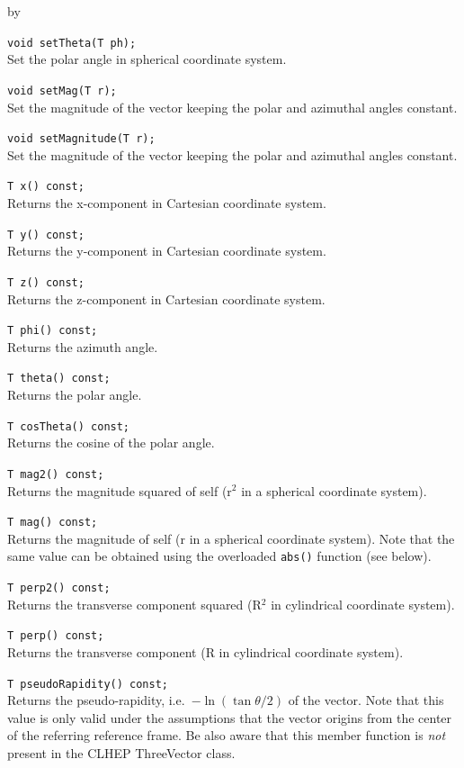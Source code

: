 \documentclass[twoside]{article}
\newcommand{\comp}[1]{\texttt{#1}}%
\newcommand{\entrylabel}[1]{\mbox{\textbf{{#1}}}\hfil}%
\newenvironment{entry}
{\begin{list}{}%
    {\renewcommand{\makelabel}{\entrylabel}%
     \setlength{\labelwidth}{90pt}%
     \setlength{\leftmargin}{\labelwidth}
     \advance\leftmargin by \labelsep%
      }%
    }%
  {\end{list}}
\newcommand{\Entrylabel}[1]%
{\raisebox{0pt}[1ex][0pt]{\makebox[\labelwidth][l]%
    {\parbox[t]{\labelwidth}{\hspace{0pt}\textbf{{#1}}}}}}
\newenvironment{Entry}%
{\renewcommand{\entrylabel}{\Entrylabel}\begin{entry}}%
  {\end{entry}}
\begin{document}
\begin{description}
\begin{Entry}
    \verb+void setTheta(T ph);+\\
    Set the polar angle in spherical coordinate system.

    \verb+void setMag(T r);+\\
    Set the magnitude of the vector keeping the polar and azimuthal
    angles constant.

    \verb+void setMagnitude(T r);+\\
    Set the magnitude of the vector keeping the polar and azimuthal
    angles constant.
    
    \verb+T x() const;+\\
    Returns the x-component in Cartesian coordinate system.
    
    \verb+T y() const;+\\
    Returns the y-component in Cartesian coordinate system.
    
    \verb+T z() const;+\\
    Returns the z-component in Cartesian coordinate system.
    
    \verb+T phi() const;+\\
    Returns the azimuth angle.
    
    \verb+T theta() const;+\\
    Returns the polar angle.
    
    \verb+T cosTheta() const;+\\
    Returns the cosine of the polar angle.
    
    \verb+T mag2() const;+\\
    Returns the magnitude squared of self (r$^2$ in a spherical coordinate system).
    
    \verb+T mag() const;+\\
    Returns the magnitude of self (r in a spherical coordinate system).
    Note that the same value can be obtained using the overloaded
    \comp{abs()} function (see below). 
    
    \verb+T perp2() const;+\\
    Returns the transverse component squared
    (R$^2$ in cylindrical coordinate system).
    
    \verb+T perp() const;+\\
    Returns the transverse component
    (R in cylindrical coordinate system). 
    
    \verb+T pseudoRapidity() const;+\\
    Returns the pseudo-rapidity, i.e.~$-\ln(\tan \theta/2)$ of the
    vector. Note that this value is only valid under the assumptions
    that the vector origins from the center of the referring
    reference frame. Be also aware that this member function is
    {\em not} present in the CLHEP ThreeVector class.
    

\end{Entry}
\end{description}
\end{document}
